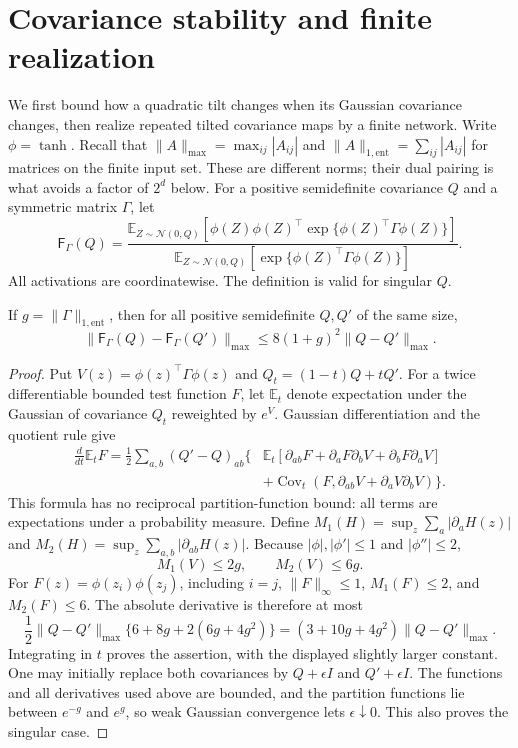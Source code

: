 \section{Covariance stability and finite realization}\label{sec:compression}
We first bound how a quadratic tilt changes when its Gaussian covariance
changes, then realize repeated tilted covariance maps by a finite network.
Write $\phi=\tanh$. Recall that $\|A\|_{\max}=\max_{ij}|A_{ij}|$ and
$\|A\|_{1,\mathrm{ent}}=\sum_{ij}|A_{ij}|$ for matrices on the finite input
set. These are different norms; their dual pairing is what avoids a factor
of $2^d$ below.
For a positive semidefinite covariance $Q$ and a symmetric matrix $\Gamma$,
let
\[
 \mathsf F_\Gamma(Q)=
 \frac{\mathbb E_{Z\sim\mathcal N(0,Q)}
 [\phi(Z)\phi(Z)^\top\exp\{\phi(Z)^\top\Gamma\phi(Z)\}]}
 {\mathbb E_{Z\sim\mathcal N(0,Q)}
 [\exp\{\phi(Z)^\top\Gamma\phi(Z)\}]}.
\]
All activations are coordinatewise. The definition is valid for singular $Q$.

\begin{lemma}\label{lem:tilted-covariance}
If $g=\|\Gamma\|_{1,\mathrm{ent}}$, then for all positive semidefinite
$Q,Q'$ of the same size,
\[
 \|\mathsf F_\Gamma(Q)-\mathsf F_\Gamma(Q')\|_{\max}
 \leq 8(1+g)^2\|Q-Q'\|_{\max}.
\]
\end{lemma}
\begin{proof}
Put $V(z)=\phi(z)^\top\Gamma\phi(z)$ and
$Q_t=(1-t)Q+tQ'$. For a twice differentiable bounded test function $F$, let
$\mathbb E_t$ denote expectation under the Gaussian of covariance $Q_t$
reweighted by $e^V$. Gaussian differentiation and the quotient rule give
\begin{align*}
 \frac{d}{dt}\mathbb E_tF
 =\frac12\sum_{a,b}(Q'-Q)_{ab}\bigl\{
 &\mathbb E_t[\partial_{ab}F+
       \partial_aF\partial_bV+\partial_bF\partial_aV]\\
 &+\operatorname{Cov}_t(F,\partial_{ab}V+
                                   \partial_aV\partial_bV)\bigr\}.
\end{align*}
This formula has no reciprocal partition-function bound: all terms are
expectations under a probability measure. Define
$M_1(H)=\sup_z\sum_a|\partial_aH(z)|$ and
$M_2(H)=\sup_z\sum_{a,b}|\partial_{ab}H(z)|$.
Because $|\phi|,|\phi'|\leq1$ and $|\phi''|\leq2$,
\[
 M_1(V)\leq2g,\qquad M_2(V)\leq6g.
\]
For $F(z)=\phi(z_i)\phi(z_j)$, including $i=j$,
$\|F\|_\infty\leq1$, $M_1(F)\leq2$, and $M_2(F)\leq6$.
The absolute derivative is therefore at most
\[
 \frac12\|Q-Q'\|_{\max}
 \{6+8g+2(6g+4g^2)\}
 =(3+10g+4g^2)\|Q-Q'\|_{\max}.
\]
Integrating in $t$ proves the assertion, with the displayed slightly larger
constant. One may initially replace both covariances by $Q+\epsilon I$ and
$Q'+\epsilon I$. The functions and all derivatives used above are bounded,
and the partition functions lie between $e^{-g}$ and $e^g$, so weak Gaussian
convergence lets $\epsilon\downarrow0$. This also proves the singular case.
\end{proof}

